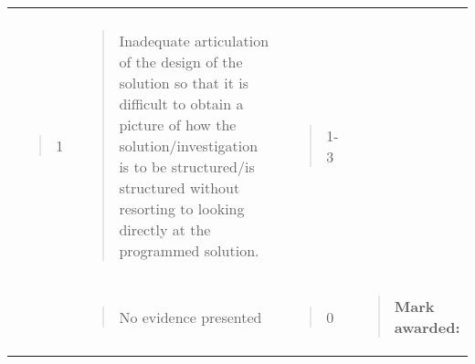 \documentclass[
]{article}
\begin{document}
\begin{longtable}[]{@{}llll@{}}
\begin{minipage}[t]{0.22\columnwidth}
\strut
\end{minipage}\tabularnewline
\begin{minipage}[t]{0.22\columnwidth}\raggedright
\begin{quote}
1
\end{quote}\strut
\end{minipage} & \begin{minipage}[t]{0.22\columnwidth}\raggedright
\begin{quote}
Inadequate articulation of the design of the solution so that it is
difficult to obtain a picture of how the solution/investigation is to be
structured/is structured without resorting to looking directly at the
programmed solution.
\end{quote}\strut
\end{minipage} & \begin{minipage}[t]{0.22\columnwidth}\raggedright
\begin{quote}
1-3
\end{quote}\strut
\end{minipage} & \begin{minipage}[t]{0.22\columnwidth}\raggedright
\strut
\end{minipage}\tabularnewline
\begin{minipage}[t]{0.22\columnwidth}\raggedright
\strut
\end{minipage} & \begin{minipage}[t]{0.22\columnwidth}\raggedright
\begin{quote}
No evidence presented
\end{quote}\strut
\end{minipage} & \begin{minipage}[t]{0.22\columnwidth}\raggedright
\begin{quote}
0
\end{quote}\strut
\end{minipage} & \begin{minipage}[t]{0.22\columnwidth}\raggedright
\begin{quote}
\textbf{Mark awarded:}
\end{quote}\strut
\end{minipage}\tabularnewline
\bottomrule
\end{longtable}
\end{document}

